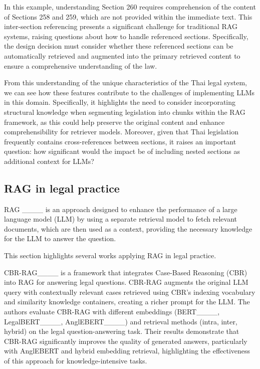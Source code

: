 In this example, understanding Section 260 requires comprehension of the content of Sections 258 and 259, which are not provided within the immediate text. 
%
This inter-section referencing presents a significant challenge for traditional RAG systems, raising questions about how to handle referenced sections. 
%
Specifically, the design decision must consider whether these referenced sections can be automatically retrieved and augmented into the primary retrieved content to ensure a comprehensive understanding of the law.

From this understanding of the unique characteristics of the Thai legal system, we can see how these features contribute to the challenges of implementing LLMs in this domain. 
%
Specifically, it highlights the need to consider incorporating structural knowledge when segmenting legislation into chunks within the RAG framework, as this could help preserve the original content and enhance comprehensibility for retriever models. 
%
Moreover, given that Thai legislation frequently contains cross-references between sections, it raises an important question: how significant would the impact be of including nested sections as additional context for LLMs?  


\subsection{RAG in legal practice}

{
RAG ____ is an approach designed to enhance the performance of a large language model (LLM) by using a separate retrieval model to fetch relevant documents, which are then used as a context, providing the necessary knowledge for the LLM to answer the question.

This section highlights several works applying RAG in legal practice.
}

\label{sec:raginlegal}
CBR-RAG____ is a framework that integrates Case-Based Reasoning (CBR) into RAG for answering legal questions.
%
CBR-RAG augments the original LLM query with contextually relevant cases retrieved using CBR’s indexing vocabulary and similarity knowledge containers, creating a richer prompt for the LLM. 
%
The authors evaluate CBR-RAG with different embeddings (BERT____, LegalBERT____, AnglEBERT____) and retrieval methods (intra, inter, hybrid) on the legal question-answering task. 
%
Their results demonstrate that CBR-RAG significantly improves the quality of generated answers, particularly with AnglEBERT and hybrid embedding retrieval, highlighting the effectiveness of this approach for knowledge-intensive tasks.

